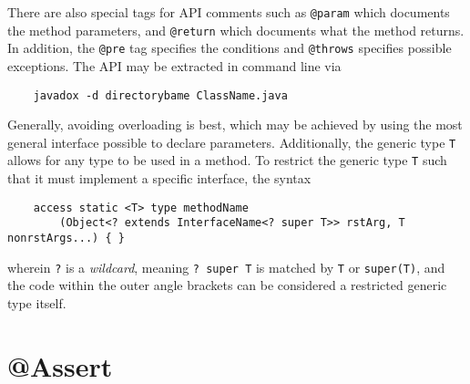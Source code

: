 \documentclass[letterpaper, openany, justified]{tufte-book}
\newcommand{\cd}[1]{\lstinline{#1}}
\begin{document}
\begin{fullwidth}
\bigskip
There are also special tags for API comments such as \cd{@param} which documents the method parameters, and \cd{@return} which documents what the method returns. In addition, the \cd{@pre} tag specifies the conditions and \cd{@throws} specifies possible exceptions. The API may be extracted in command line via
\begin{lstlisting}
    javadox -d directorybame ClassName.java
\end{lstlisting}
Generally, avoiding overloading is best, which may be achieved by using the most general interface possible to declare parameters. Additionally, the generic type \cd{T} allows for any type to be used in a method. To restrict the generic type \cd{T} such that it must implement a specific interface, the syntax
\begin{lstlisting}
    access static <T> type methodName
        (Object<? extends InterfaceName<? super T>> rstArg, T nonrstArgs...) { }
\end{lstlisting}
wherein \cd{?} is a \emph{wildcard}, meaning \cd{? super T} is matched by \cd{T} or \cd{super(T)}, and the code within the outer angle brackets can be considered a restricted generic type itself.

\section{@Assert}


\end{fullwidth}
\end{document}
